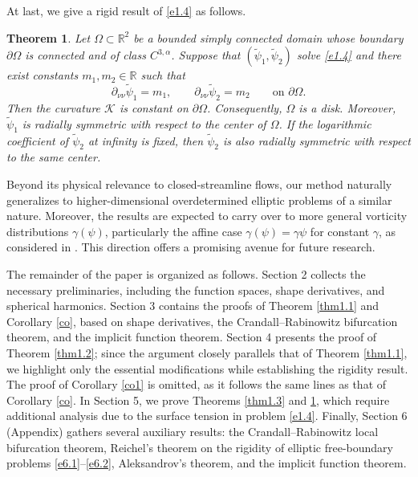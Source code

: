 \documentclass[reqno]{amsart}
\numberwithin{equation}{section}
\newtheorem{theorem}{Theorem}[section]
\numberwithin{equation}{section}
\numberwithin{equation}{section}
\begin{document}
At last, we give a rigid result of \eqref{e1.4} as follows.

\begin{theorem} \label{thm1.4}
 Let $\Omega\subset\mathbb R^2$ be a bounded simply connected domain whose boundary $\partial\Omega$ is connected and of class $C^{3,\alpha}$. Suppose that $(\widetilde{\psi}_{1}, \widetilde{\psi}_{2})$ solve \eqref{e1.4}
and there exist constants $m_1,m_2\in\mathbb R$ such that
 \[ \partial_{\nu\nu}\widetilde{\psi}_{1}=m_1, \qquad \partial_{\nu\nu}\widetilde{\psi}_{2}=m_2 \qquad\text{on }\partial\Omega. \] Then the curvature $\mathcal{K}$ is constant on $\partial\Omega$. Consequently, $\Omega$ is a disk. Moreover, $\widetilde{\psi}_{1}$ is radially symmetric with respect to the center of $\Omega$. If the logarithmic coefficient of $\widetilde{\psi}_{2}$ at infinity is fixed, then $\widetilde{\psi}_{2}$ is also radially symmetric with respect to the same center.
 \end{theorem}

Beyond its physical relevance to closed-streamline flows, our method naturally generalizes to higher-dimensional overdetermined elliptic problems of a similar nature. Moreover, the results are expected to carry over to more general vorticity distributions \(\gamma(\psi)\), particularly the affine case \(\gamma(\psi)=\gamma\psi\) for constant \(\gamma\), as considered in \cite{Eh,EncisoARS}. This direction offers a promising avenue for future research.

The remainder of the paper is organized as follows. Section 2 collects the necessary preliminaries, including the function spaces, shape derivatives, and spherical harmonics. Section 3 contains the proofs of Theorem \ref{thm1.1} and Corollary \ref{co}, based on shape derivatives, the Crandall--Rabinowitz bifurcation theorem, and the implicit function theorem. Section 4 presents the proof of Theorem \ref{thm1.2}; since the argument closely parallels that of Theorem \ref{thm1.1}, we highlight only the essential modifications while establishing the rigidity result. The proof of Corollary \ref{co1} is omitted, as it follows the same lines as that of Corollary \ref{co}. In Section 5, we prove Theorems \ref{thm1.3} and \ref{thm1.4}, which require additional analysis due to the surface tension in problem \eqref{e1.4}. Finally, Section 6 (Appendix) gathers several auxiliary results: the Crandall--Rabinowitz local bifurcation theorem, Reichel's theorem on the rigidity of elliptic free-boundary problems \eqref{e6.1}--\eqref{e6.2}, Aleksandrov's theorem, and the implicit function theorem.
\end{document}
